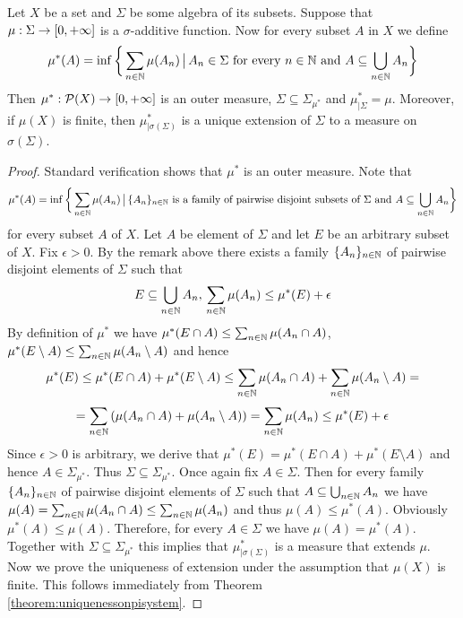 \begin{theorem}\label{theorem:caratheodoryextensionresult}
Let $X$ be a set and $\Sigma$ be some algebra of its subsets. Suppose that $\mu:\Sigma\rightarrow [0,+\infty]$ is a $\sigma$-additive function. Now for every subset $A$ in $X$ we define
$$\mu^*(A) = \inf \bigg\{\sum_{n\in {\mathbb N}}\mu(A_n)\,\big|\,A_n\in \Sigma\mbox{ for every }n\in {\mathbb N}\mbox{ and }A\subseteq \bigcup_{n\in {\mathbb N}}A_n\bigg\}$$
Then $\mu^*:{\mathcal P}(X)\rightarrow [0,+\infty]$ is an outer measure, $\Sigma \subseteq \Sigma_{\mu^*}$ and $\mu^*_{\mid \Sigma} = \mu$. Moreover, if $\mu(X)$ is finite, then $\mu^*_{\mid \sigma(\Sigma)}$ is a unique extension of $\Sigma$ to a measure on $\sigma(\Sigma)$.
\end{theorem}
\begin{proof}
Standard verification shows that $\mu^*$ is an outer measure. Note that 
$$\mu^*(A) = \inf \bigg\{\sum_{n\in {\mathbb N}}\mu(A_n)\,\big|\,\{A_n\}_{n\in {\mathbb N}}\mbox{ is a family of pairwise disjoint subsets of }\Sigma \mbox{ and }A\subseteq \bigcup_{n\in {\mathbb N}}A_n\bigg\}$$
for every subset $A$ of $X$. Let $A$ be element of $\Sigma$ and let $E$ be an arbitrary subset of $X$. Fix $\epsilon > 0$. By the remark above there exists a family $\{A_n\}_{n\in {\mathbb N}}$ of pairwise disjoint elements of $\Sigma$ such that
$$E\subseteq \bigcup_{n\in {\mathbb N}}A_n,\,\sum_{n\in {\mathbb N}}\mu(A_n)\leq \mu^*(E)+\epsilon$$
By definition of $\mu^*$ we have $\mu^*(E\cap A)\leq \sum_{n\in {\mathbb N}}\mu(A_n\cap A)$, $\mu^*(E\setminus A) \leq \sum_{n\in {\mathbb N}}\mu(A_n\setminus A)$ and hence
$$\mu^*(E)\leq \mu^*(E\cap A)+\mu^*(E\setminus A) \leq \sum_{n\in {\mathbb N}}\mu(A_n\cap A)+\sum_{n\in {\mathbb N}}\mu(A_n\setminus A)=$$
$$=\sum_{n\in {\mathbb N}}\left(\mu(A_n\cap A)+\mu(A_n\setminus A)\right)=\sum_{n\in {\mathbb N}}\mu(A_n)\leq \mu^*(E)+\epsilon$$
Since $\epsilon > 0$ is arbitrary, we derive that $\mu^*(E) = \mu^*(E\cap A)+\mu^*(E\setminus A)$ and hence $A\in \Sigma_{\mu^*}$. Thus $\Sigma \subseteq \Sigma_{\mu^*}$. Once again fix $A\in \Sigma$. Then for every family $\{A_n\}_{n\in {\mathbb N}}$ of pairwise disjoint elements of $\Sigma$ such that $A\subseteq \bigcup_{n\in {\mathbb N}}A_n$ we have $\mu(A) = \sum_{n\in {\mathbb N}}\mu(A_n\cap A)\leq \sum_{n\in {\mathbb N}}\mu(A_n)$ and thus $\mu(A)\leq \mu^*(A)$. Obviously $\mu^*(A)\leq \mu(A)$. Therefore, for every $A\in \Sigma$ we have $\mu(A) = \mu^*(A)$. Together with $\Sigma\subseteq \Sigma_{\mu^*}$ this implies that $\mu^*_{\mid \sigma(\Sigma)}$ is a measure that extends $\mu$. Now we prove the uniqueness of extension under the assumption that $\mu(X)$ is finite. This follows immediately from Theorem \ref{theorem:uniquenessonpisystem}.
\end{proof}

